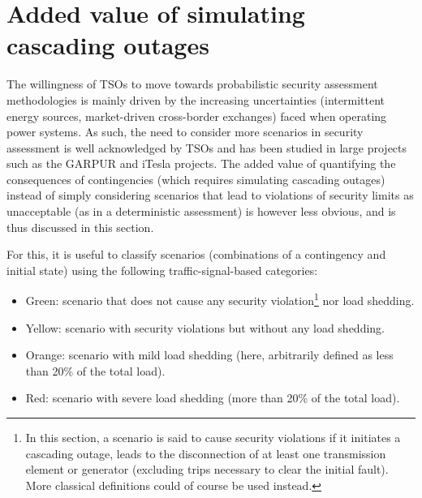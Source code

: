 
\section{Added value of simulating cascading outages}
\label{sec:cascade_value}

The willingness of TSOs to move towards probabilistic security assessment methodologies is mainly driven by the increasing uncertainties (intermittent energy sources, market-driven cross-border exchanges) faced when operating power systems. As such, the need to consider more scenarios in security assessment is well acknowledged by TSOs and has been studied in large projects such as the GARPUR and iTesla projects. The added value of quantifying the consequences of contingencies (which requires simulating cascading outages) instead of simply considering scenarios that lead to violations of security limits as unacceptable (as in a deterministic assessment) is however less obvious, and is thus discussed in this section.

For this, it is useful to classify scenarios (combinations of a contingency and initial state) using the following traffic-signal-based categories:

\begin{itemize}
  \item Green: scenario that does not cause any security violation\footnote{In this section, a scenario is said to cause security violations if it initiates a cascading outage, \ie leads to the disconnection of at least one transmission element or generator (excluding trips necessary to clear the initial fault). More classical definitions could of course be used instead.} nor load shedding.
  \item Yellow: scenario with security violations but without any load shedding.
  \item Orange: scenario with mild load shedding (here, arbitrarily defined as less than 20\% of the total load).
  \item Red: scenario with severe load shedding (more than 20\% of the total load).
\end{itemize}

